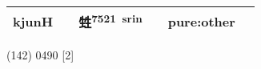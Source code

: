 \documentclass[14pt,a4paper]{scrartcl}
\begin{document}
\begin{longtable}[c]{@{}llllll@{}}
\begin{minipage}[t]{0.14\columnwidth}
kjunH
\strut\end{minipage} &
\begin{minipage}[t]{0.14\columnwidth}\raggedright\strut
\strut\end{minipage} &
\begin{minipage}[t]{0.14\columnwidth}\raggedright\strut
甡\textsuperscript{7521~srin}
\strut\end{minipage} &
\begin{minipage}[t]{0.14\columnwidth}\raggedright\strut
\strut\end{minipage} &
\begin{minipage}[t]{0.14\columnwidth}\raggedright\strut
pure:other
\strut\end{minipage}\tabularnewline
\bottomrule
\end{longtable}

(142) 0490 {[}2{]}
\end{document}
